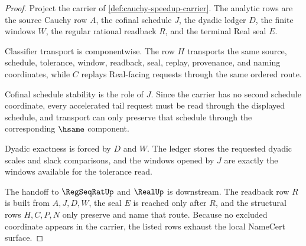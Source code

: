 \begin{proof}
Project the carrier of \autoref{def:cauchy-speedup-carrier}. The analytic rows are the source Cauchy row $A$, the cofinal schedule $J$, the dyadic ledger $D$, the finite windows $W$, the regular rational readback $R$, and the terminal Real seal $E$.

Classifier transport is componentwise. The row $H$ transports the same source, schedule, tolerance, window, readback, seal, replay, provenance, and naming coordinates, while $C$ replays Real-facing requests through the same ordered route.

Cofinal schedule stability is the role of $J$. Since the carrier has no second schedule coordinate, every accelerated tail request must be read through the displayed schedule, and transport can only preserve that schedule through the corresponding $\hsame$ component.

Dyadic exactness is forced by $D$ and $W$. The ledger stores the requested dyadic scales and slack comparisons, and the windows opened by $J$ are exactly the windows available for the tolerance read.

The handoff to $\RegSeqRatUp$ and $\RealUp$ is downstream. The readback row $R$ is built from $A,J,D,W$, the seal $E$ is reached only after $R$, and the structural rows $H,C,P,N$ only preserve and name that route. Because no excluded coordinate appears in the carrier, the listed rows exhaust the local NameCert surface.
\end{proof}

\begin{closurestatus}{\CauchySpeedupUp}
  \theoryclosure{\seedClosure}
  \formalstatus{\unformalizedV}
\end{closurestatus}
